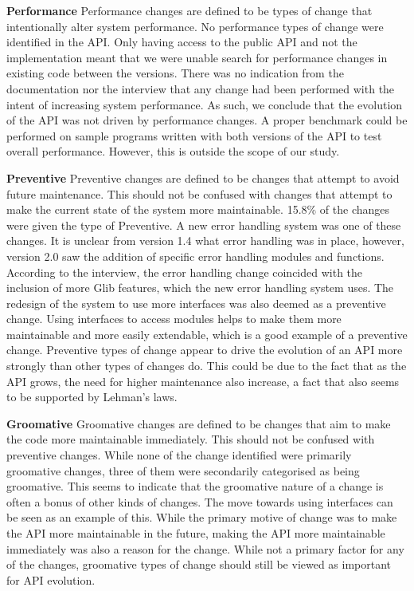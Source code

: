 \documentclass{sig-alternate}
\begin{document}
\smallskip \noindent
\textbf{Performance  }
Performance changes are defined to be types of change that intentionally alter system performance.
No performance types of change were identified in the API. Only having access to the public API and not the implementation meant that we were unable search for performance changes in existing code between the versions. There was no indication from the documentation nor the interview that any change had been performed with the intent of increasing system performance. 
As such, we conclude that the evolution of the API was not driven by performance changes. A proper benchmark could be performed on sample programs written with both versions of the API to test overall performance. However, this is outside the scope of our study.

\smallskip \noindent
\textbf{Preventive  }
Preventive changes are defined to be changes that attempt to avoid future maintenance. This should not be confused with changes that attempt to make the current state of the system more maintainable.
15.8\% of the changes were given the type of Preventive. A new error handling system was one of these changes. It is unclear from version 1.4 what error handling was in place, however, version 2.0 saw the addition of specific error handling modules and functions. According to the interview, the error handling change coincided with the inclusion of more Glib features, which the new error handling system uses. The redesign of the system to use more interfaces was also deemed as a preventive change. Using interfaces to access modules helps to make them more maintainable and more easily extendable, which is a good example of a preventive change.
Preventive types of change appear to drive the evolution of an API more strongly than other types of changes do. This could be due to the fact that as the API grows, the need for higher maintenance also increase, a fact that also seems to be supported by Lehman's laws.

\smallskip \noindent
\textbf{Groomative  }
Groomative changes are defined to be changes that aim to make the code more maintainable immediately. This should not be confused with preventive changes.
While none of the change identified were primarily groomative changes, three of them were secondarily categorised as being groomative. This seems to indicate that the groomative nature of a change is often a bonus of other kinds of changes. The move towards using interfaces can be seen as an example of this. While the primary motive of change was to make the API more maintainable in the future, making the API more maintainable immediately was also a reason for the change.
While not a primary factor for any of the changes, groomative types of change should still be viewed as important for API evolution.
\end{document}
